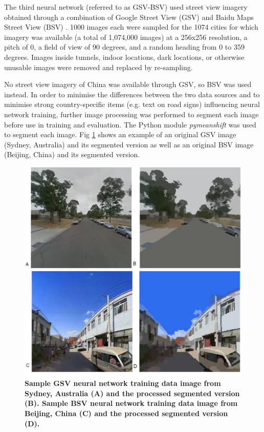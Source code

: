 \documentclass[Crown,sageh,times]{sagej}
\begin{document}
The third neural network (referred to as GSV-BSV) used street view imagery obtained through a combination of Google Street View (GSV) \cite{GoogleMaps2017b} and Baidu Maps Street View (BSV) \cite{Baidu2017}. 1000 images each were sampled for the 1074 cities for which imagery was available (a total of 1,074,000 images) at a 256x256 resolution, a pitch of 0, a field of view of 90 degrees, and a random heading from 0 to 359 degrees. Images inside tunnels, indoor locations, dark locations, or otherwise unusable images were removed and replaced by re-sampling.

No street view imagery of China was available through GSV, so BSV was used instead.  In order to minimise the differences between the two data sources and to minimise strong country-specific items (e.g. text on road signs) influencing neural network training, further image processing was performed to segment each image before use in training and evaluation. The Python module \textit{pymeanshift} \cite{Pymeanshift2017} was used to segment each image. Fig \ref{fig:gsvbsv} shows an example of an original GSV image (Sydney, Australia) and its segmented version as well as an original BSV image (Beijing, China) and its segmented version.




\begin{figure}[!htbp]
\includegraphics[scale=0.3]{Images/PlosOne/Fig4.png} 
\caption{\bf Sample GSV neural network training data image from Sydney, Australia \cite{GoogleMaps2017b} (A) and the processed segmented version (B). Sample BSV neural network training data image from Beijing, China \cite{Baidu2017} (C) and the processed segmented version (D).}    
 \label{fig:gsvbsv}  
\end{figure} 
\end{document}
